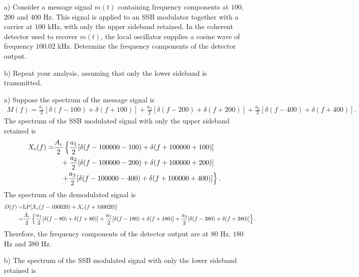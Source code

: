 \documentclass{assignment}
\begin{document}
\begin{prob}
    \begin{itemize}
        \item[a)] Consider a message signal $m(t)$ containing frequency components at $100$, $200$ and $400$ Hz. This signal is applied to an SSB modulator together with a carrier at $100$ kHz, with only the upper sideband retained. In the coherent detector used to recover $m(t)$, the local oscillator supplies a cosine wave of frequency $100.02$ kHz. Determine the frequency components of the detector output.
        \item[b)] Repeat your analysis, assuming that only the lower sideband is transmitted.
    \end{itemize}
\end{prob}
\begin{sol}
    \begin{itemize}
        \item[a)] Suppose the spectrum of the message signal is
        \begin{align}
            M(f)=\frac{a_1}{2}[\delta(f-100)+\delta(f+100)]+\frac{a_2}{2}[\delta(f-200)+\delta(f+200)]+\frac{a_3}{2}[\delta(f-400)+\delta(f+400)].
        \end{align}
        The spectrum of the SSB modulated signal with only the upper sideband retained is
        \begin{align}
            \notag X_c(f)=&\frac{A_c}{2}\left\{\frac{a_1}{2}[\delta(f-100000-100)+\delta(f+100000+100)]\right.\\
            \notag&\quad+\frac{a_2}{2}[\delta(f-100000-200)+\delta(f+100000+200)]\\
            &\quad\left.+\frac{a_3}{2}[\delta(f-100000-400)+\delta(f+100000+400)]\right\}.
        \end{align}
        The spectrum of the demodulated signal is
        \begin{align}
            \notag D(f)=&\text{LP}[X_c(f-100020)+X_c(f+100020)]\\
            =&\frac{A_c}{2}\left\{\frac{a_1}{2}[\delta(f-80)+\delta(f+80)]+\frac{a_2}{2}[\delta(f-180)+\delta(f+180)]+\frac{a_3}{2}[\delta(f-380)+\delta(f+380)]\right\}.
        \end{align}
        Therefore, the frequency components of the detector output are at $80$ Hz, $180$ Hz and $380$ Hz.
        \item[b)] The spectrum of the SSB modulated signal with only the lower sideband retained is
        \begin{align}

\end{align}
\end{itemize}
\end{sol}
\end{document}
